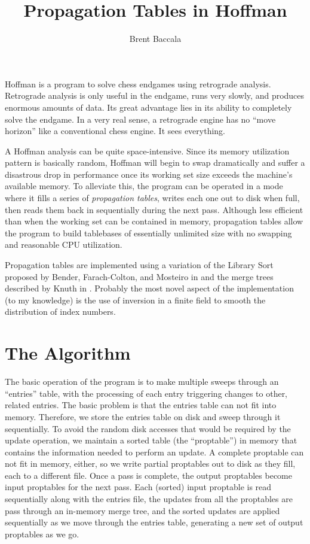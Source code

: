 \documentclass[11pt]{article}
\title{Propagation Tables in Hoffman}
\author{Brent Baccala}
\begin{document}
\maketitle

\parindent 0pt
\parskip 12pt

Hoffman is a program to solve chess endgames using retrograde
analysis.  Retrograde analysis is only useful in the endgame, runs
very slowly, and produces enormous amounts of data.  Its great
advantage lies in its ability to completely solve the endgame.  In a
very real sense, a retrograde engine has no ``move horizon'' like a
conventional chess engine.  It sees everything.

A Hoffman analysis can be quite space-intensive.  Since its
memory utilization pattern is basically random, Hoffman will begin to
swap dramatically and suffer a disastrous drop in performance once its
working set size exceeds the machine's available memory.  To alleviate
this, the program can be operated in a mode where it fills a series of
{\it propagation tables}, writes each one out to disk when full, then
reads them back in sequentially during the next pass.  Although less
efficient than when the working set can be contained in memory,
propagation tables allow the program to build tablebases of
essentially unlimited size with no swapping and reasonable CPU
utilization.

Propagation tables are implemented using a variation of the Library
Sort proposed by Bender, Farach-Colton, and Mosteiro in \cite{bender} and the merge
trees described by Knuth in \cite{knuth}.  Probably the most novel aspect of
the implementation (to my knowledge) is the use of inversion in a
finite field to smooth the distribution of index numbers.

\section{The Algorithm}

The basic operation of the program is to make multiple sweeps through
an ``entries'' table, with the processing of each entry triggering
changes to other, related entries.  The basic problem is that the
entries table can not fit into memory.  Therefore, we store the
entries table on disk and sweep through it sequentially.  To avoid the
random disk accesses that would be required by the update operation,
we maintain a sorted table (the ``proptable'') in memory that contains
the information needed to perform an update.  A complete proptable can
not fit in memory, either, so we write partial proptables out to disk
as they fill, each to a different file.  Once a pass is complete, the
output proptables become input proptables for the next pass.  Each
(sorted) input proptable is read sequentially along with the entries
file, the updates from all the proptables are pass through an
in-memory merge tree, and the sorted updates are applied sequentially
as we move through the entries table, generating a new set of output
proptables as we go.
\end{document}
